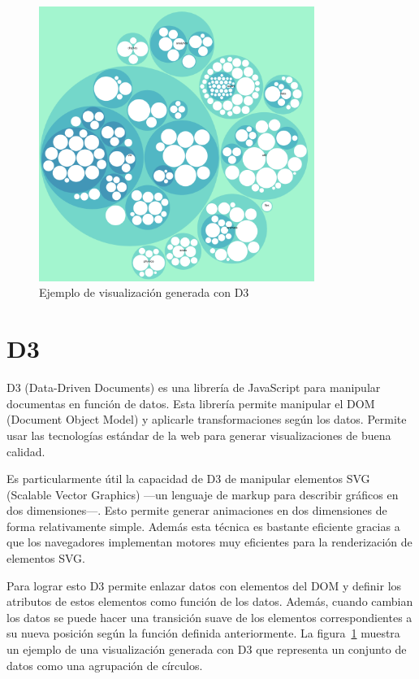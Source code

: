 \begin{figure}[H]
    \centering
    \includegraphics[width=0.8\textwidth]{imagenes/d3/ejemplo.png}
    \caption{Ejemplo de visualización generada con D3}
    \label{fig:d3-ejemplo}
\end{figure}

\section{D3}

D3 (Data-Driven Documents) es una librería de JavaScript para manipular documentas en función de datos. Esta librería permite manipular el DOM (Document Object Model) y aplicarle transformaciones según los datos. Permite usar las tecnologías estándar de la web para generar visualizaciones de buena calidad.

Es particularmente útil la capacidad de D3 de manipular elementos SVG (Scalable Vector Graphics) ---un lenguaje de markup para describir gráficos en dos dimensiones---. Esto permite generar animaciones en dos dimensiones de forma relativamente simple. Además esta técnica es bastante eficiente gracias a que los navegadores implementan motores muy eficientes para la renderización de elementos SVG.

Para lograr esto D3 permite enlazar datos con elementos del DOM y definir los atributos de estos elementos como función de los datos. Además, cuando cambian los datos se puede hacer una transición suave de los elementos correspondientes a su nueva posición según la función definida anteriormente. La figura~\ref{fig:d3-ejemplo} muestra un ejemplo de una visualización generada con D3 que representa un conjunto de datos como una agrupación de círculos.

